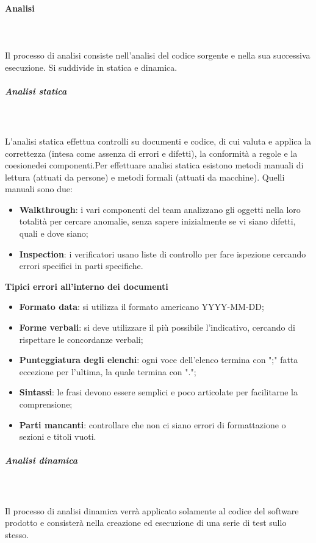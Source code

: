 		\paragraph{Analisi} \mbox{}\\ \mbox{}\\
		Il processo di analisi consiste nell'analisi del codice sorgente e nella sua successiva esecuzione. Si suddivide in statica e dinamica.\\
			\subparagraph{Analisi statica} \mbox{}\\ \mbox{}\\
			L'analisi statica effettua controlli su documenti e codice, di cui valuta e applica la correttezza (intesa come assenza di errori e difetti), la conformità a regole e la coesione\glosp dei componenti.\newline Per effettuare analisi statica esistono metodi manuali di lettura (attuati da persone) e metodi formali (attuati da macchine). Quelli manuali sono due:
			\begin{itemize}
				\item \textbf{Walkthrough}: i vari componenti del team analizzano gli oggetti nella loro totalità per cercare anomalie, senza sapere inizialmente se vi siano difetti, quali e dove siano;
				\item \textbf{Inspection}: i verificatori usano liste di controllo per fare ispezione cercando errori specifici in parti specifiche.
			\end{itemize}
			\textbf{Tipici errori all'interno dei documenti}
			\begin{itemize}
				\item \textbf{Formato data}: si utilizza il formato americano YYYY-MM-DD;
				\item \textbf{Forme verbali}: si deve utilizzare il più possibile l'indicativo, cercando di rispettare le concordanze verbali;
				\item \textbf{Punteggiatura degli elenchi}: ogni voce dell'elenco termina con ";" fatta eccezione per l'ultima, la quale termina con ".";
				\item \textbf{Sintassi}: le frasi devono essere semplici e poco articolate per facilitarne la comprensione;
				\item \textbf{Parti mancanti}: controllare che non ci siano errori di formattazione o sezioni e titoli vuoti.
			\end{itemize}			
														
			\subparagraph{Analisi dinamica} \mbox{}\\ \mbox{}\\
			Il processo di analisi dinamica verrà applicato solamente al codice del software prodotto e consisterà nella creazione ed esecuzione di una serie di test sullo stesso. 
			
